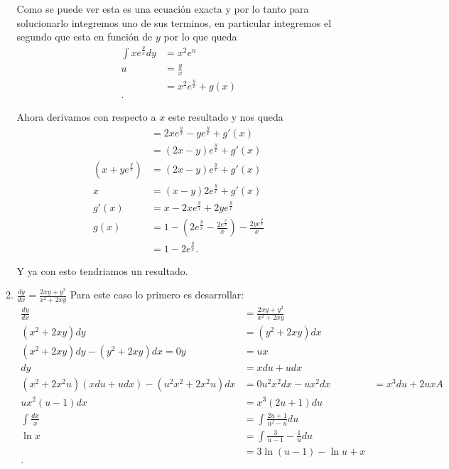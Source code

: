 \begin{enumerate}
\begin{enumerate}
	    Como se puede ver esta es una ecuación exacta y por lo tanto para solucionarlo integremos uno de sus terminos, en particular integremos el segundo que esta en función de $y$ por lo que queda
	    \begin{align*}
	      \int xe^{\frac{y}{x}}dy &= x^2e^{u} \\
	      u &= \frac{y}{x} \\
	      &= x^2e^{\frac{y}{x}} + g\left( x \right) \\
	    .\end{align*}

	    Ahora derivamos con respecto a $x$ este resultado y nos queda
	    \begin{align*}
	      &= 2xe^{\frac{y}{x}} - ye^{\frac{y}{x}} + g'(x)\\
	      &= \left( 2x - y \right)e^{\frac{y}{x}} + g'(x) \\
	      \left( x + ye^{\frac{y}{x}} \right) &=  \left( 2x - y \right)e^{\frac{y}{x}} + g'(x)\\
	      x &= (x-y)2e^{\frac{y}{x}} + g'(x)\\
	      g'(x) &=  x - 2xe^{\frac{y}{x}} + 2ye^{\frac{y}{x}}\\
	      g\left( x \right)  &= 1 - \left( 2e^{\frac{y}{x}} - \frac{2e^{\frac{y}{x}}}{x}\right) - \frac{2ye^{\frac{y}{x}}}{x} \\
	      &= 1 - 2e^{\frac{y}{x}}
	    .\end{align*}

	    Y ya con esto tendriamos un resultado.
	  \item $\frac{dy}{dx} = \frac{2xy+y^2}{x^2+2xy}$
	    Para este caso lo primero es desarrollar:
	    \begin{align*}
	      \frac{dy}{dx}&=\frac{2xy+y^2}{x^2+2xy}\\
	      \left( x^2+2xy \right) dy &= \left( y^2 + 2xy \right) dx\\
	      \left( x^2+2xy \right) dy - \left( y^2  + 2xy\right) dx = 0
	      y &= ux \\
	      dy &= xdu+udx \\
	      \left( x^2 + 2x^2u \right) \left( xdu + udx \right) - \left( u^2x^2+2x^2u \right) dx &= 0
	      u^2x^2dx - u x^2 dx &= x^{3} du + 2uxA\\
	      ux^2\left( u -1 \right) dx &= x^{3}\left( 2u + 1 \right) du\\
	      \int \frac{dx}{x} &= \int \frac{2u + 1}{u^2-u}du\\
	      \ln x &= \int \frac{3}{u - 1} - \frac{1}{u}du\\
	      &= 3 \ln\left( u - 1 \right) - \ln u + x \\
	    .\end{align*}


\end{enumerate}
\end{enumerate}

